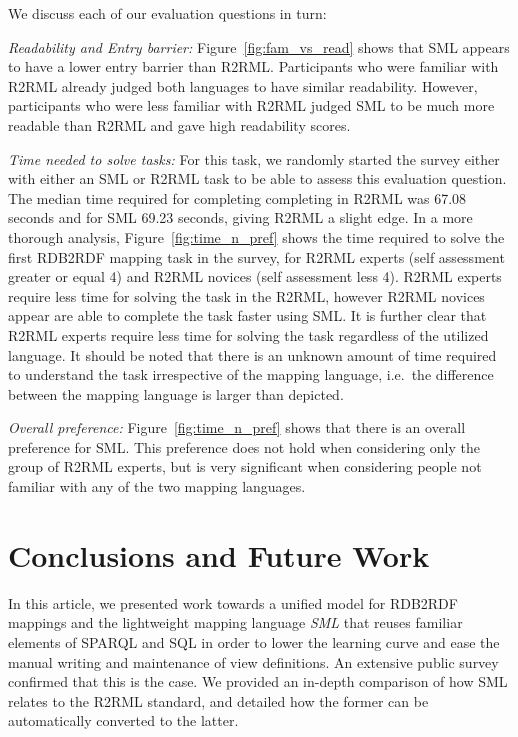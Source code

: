 We discuss each of our evaluation questions in turn:

\emph{Readability and Entry barrier:} Figure~\ref{fig:fam_vs_read} shows that SML appears to have a lower entry barrier than R2RML.
Participants who were familiar with R2RML already judged both languages to have similar readability.
However, participants who were less familiar with R2RML judged SML to be much more readable than R2RML and gave high readability scores.

\emph{Time needed to solve tasks:}
For this task, we randomly started the survey either with either an SML or R2RML task to be able to assess this evaluation question.
The median time required for completing completing in R2RML was 67.08 seconds and for SML 69.23 seconds, giving R2RML a slight edge.
In a more thorough analysis, Figure~\ref{fig:time_n_pref} shows the time required to solve the first RDB2RDF mapping task in the survey, for R2RML experts (self assessment greater or equal 4) and R2RML novices (self assessment less 4).
R2RML experts require less time for solving the task in the R2RML, however R2RML novices appear are able to complete the task faster using SML.
It is further clear that R2RML experts require less time for solving the task regardless of the utilized language.
It should be noted that there is an unknown amount of time required to understand the task irrespective of the mapping language, i.e.~the difference between the mapping language is larger than depicted.


\emph{Overall preference:} Figure~\ref{fig:time_n_pref} shows that there is an overall preference for SML. This preference does not hold when considering only the group of R2RML experts, but is very significant when considering people not familiar with any of the two mapping languages.


\section{Conclusions and Future Work} %
\label{sec:conclusion}
In this article, we presented work towards a unified model for RDB2RDF mappings and the
lightweight mapping language \emph{SML} that reuses familiar elements of SPARQL
and SQL in order to lower the learning curve and ease the manual writing and maintenance of view definitions.
An extensive public survey confirmed that this is the case.
We provided an in-depth comparison of how SML relates to the R2RML standard, and
detailed how the former can be automatically converted to the latter.

